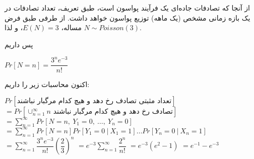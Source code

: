 \documentclass{scribe-cgenomics}
\begin{document}
\begin{حل}

از آنجا که تصادفات جاده‌ای یک فرآیند پواسون است، طبق تعریف، تعداد تصادفات در یک بازه زمانی مشخص (یک ماهه) توزیع پواسون خواهد داشت. از طرفی طبق فرض مساله،
$E(N) = 3$،
و لذا
$N \sim Poisson (3)$.

پس داریم

\begin{center}
$
Pr[N = n] = \dfrac{3^n e^{-3}}{n!}
$
\end{center}

اکنون محاسبات زیر را داریم:

\bigbreak

\begin{LTR}
$
Pr[\text{تعداد مثبتی تصادف رخ دهد و هیچ کدام مرگبار نباشند}]
$
\bigbreak
$
= Pr[\cup_{n=1}^{\infty} \text{$n$ تصادف رخ دهد و هیچ کدام مرگبار نباشند}]
$
\bigbreak
$
= \sum_{n=1}^{\infty} Pr[N=n,\ Y_1=0,\ \dots,\ Y_n=0]
$
\bigbreak
$
= \sum_{n=1}^{\infty} Pr[N=n] Pr[Y_1=0\ |\ X_1=1]\dots Pr[Y_n=0\ |\ X_n=1]
$
\bigbreak
$
= \sum_{n=1}^{\infty} \dfrac{3^n e^{-3}}{n!} (\dfrac{2}{3})^n
$
\bigbreak
$
= e^{-3} \sum_{n=1}^{\infty} \dfrac{2^n}{n!}
$
\bigbreak
$
= e^{-3} (e^2 - 1)
$
\bigbreak
$
= e^{-1} - e^{-3}
$
\end{LTR}

\end{حل}


\newpage
\begin{prob}

\end{prob}
\end{document}
